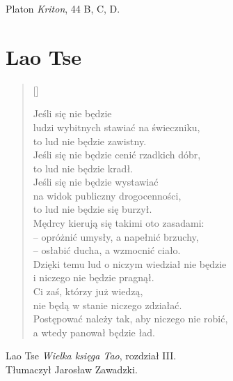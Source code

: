 \documentclass[a4paper,11pt]{article}
\newcommand{\attribA}[1]{#1}
\newcommand{\attribB}[1]{#1}
\begin{document}
\attribA{Platon \textit{Kriton}, 44 B, C, D.}










\section{Lao Tse}



\settowidth{\versewidth}{ludzi wybitnych stawiać na świeczniku,}

\begin{verse}[\versewidth]

  Jeśli się nie będzie \\
  ludzi wybitnych stawiać na świeczniku, \\
  to lud nie będzie zawistny. \\
  Jeśli się nie będzie cenić rzadkich dóbr, \\
  to lud nie będzie kradł. \\
  Jeśli się nie będzie wystawiać \\
  na widok publiczny drogocenności, \\
  to lud nie będzie się burzył. \\
  Mędrcy kierują się takimi oto zasadami: \\
  -- opróżnić umysły, a napełnić brzuchy, \\
  -- osłabić ducha, a wzmocnić ciało. \\
  Dzięki temu lud o niczym wiedział nie będzie \\
  i niczego nie będzie pragnął. \\
  Ci zaś, którzy już wiedzą, \\
  nie będą w stanie niczego zdziałać. \\
  Postępować należy tak, aby niczego nie robić, \\
  a wtedy panował będzie ład.

\end{verse}


\attribB{Lao Tse \emph{Wielka księga Tao}, rozdział III. \\
  Tłumaczył Jarosław Zawadzki.}

\vspace{\spaceThree}
\end{document}
